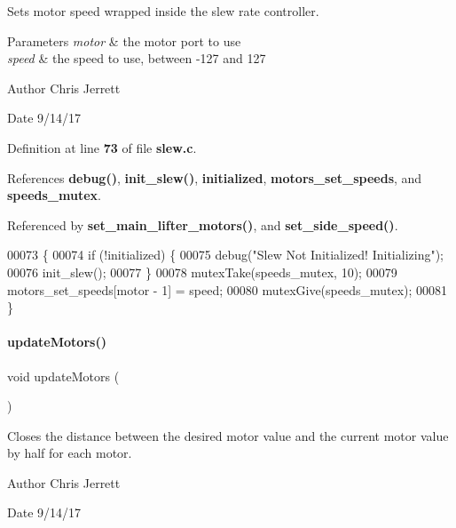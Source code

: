 Sets motor speed wrapped inside the slew rate controller. 


\begin{DoxyParams}{Parameters}
{\em motor} & the motor port to use \\
\hline
{\em speed} & the speed to use, between -\/127 and 127 \\
\hline
\end{DoxyParams}
\begin{DoxyAuthor}{Author}
Chris Jerrett 
\end{DoxyAuthor}
\begin{DoxyDate}{Date}
9/14/17 
\end{DoxyDate}


Definition at line \textbf{ 73} of file \textbf{ slew.\+c}.



References \textbf{ debug()}, \textbf{ init\+\_\+slew()}, \textbf{ initialized}, \textbf{ motors\+\_\+set\+\_\+speeds}, and \textbf{ speeds\+\_\+mutex}.



Referenced by \textbf{ set\+\_\+main\+\_\+lifter\+\_\+motors()}, and \textbf{ set\+\_\+side\+\_\+speed()}.


\begin{DoxyCode}
00073                                           \{
00074   \textcolor{keywordflow}{if} (!initialized) \{
00075     debug(\textcolor{stringliteral}{"Slew Not Initialized! Initializing"});
00076     init_slew();
00077   \}
00078   mutexTake(speeds_mutex, 10);
00079   motors_set_speeds[motor - 1] = speed;
00080   mutexGive(speeds_mutex);
00081 \}
\end{DoxyCode}
\mbox{\label{a00143_a807a87c5df438fde21c1e8213906695b}} 
\paragraph{update\+Motors()}
{\footnotesize\ttfamily void update\+Motors (\begin{DoxyParamCaption}{ }\end{DoxyParamCaption})}



Closes the distance between the desired motor value and the current motor value by half for each motor. 

\begin{DoxyAuthor}{Author}
Chris Jerrett 
\end{DoxyAuthor}
\begin{DoxyDate}{Date}
9/14/17 
\end{DoxyDate}


